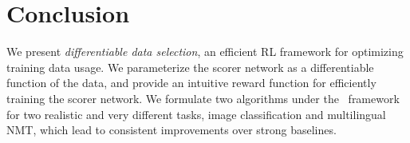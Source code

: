 \section{\label{sec:conclusion}Conclusion}
We present \emph{differentiable data selection}, an efficient RL framework for optimizing training data usage. We parameterize the scorer network as a differentiable function of the data, and provide an intuitive reward function for efficiently training the scorer network. We formulate two algorithms under the \dds~framework for two realistic and very different tasks, image classification and multilingual NMT, which lead to consistent improvements over strong baselines. 

